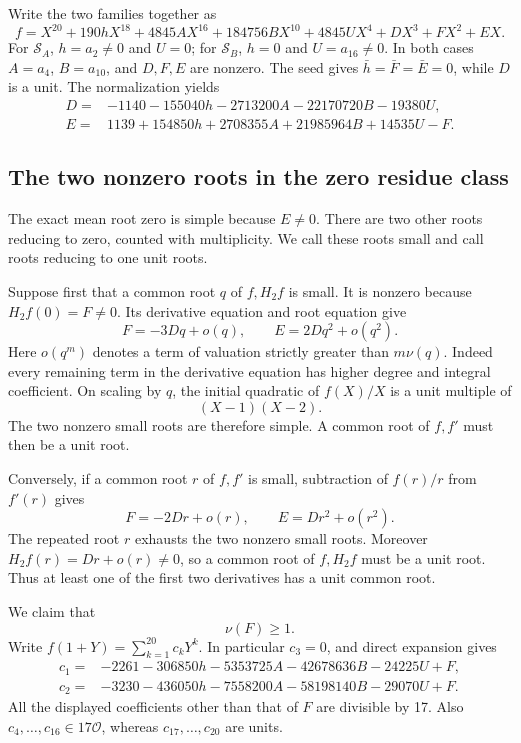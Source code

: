 \documentclass[
  british,
  10pt,
  a4paper,
]{article}
\begin{document}
Write the two families together as \[
f=X^{20}+190hX^{18}+4845AX^{16}+184756BX^{10}
   +4845UX^4+DX^3+FX^2+EX. \tag{Q1}
\] For \(\mathcal S_A\), \(h=a_2\ne0\) and \(U=0\); for
\(\mathcal S_B\), \(h=0\) and \(U=a_{16}\ne0\). In both cases \(A=a_4\),
\(B=a_{10}\), and \(D,F,E\) are nonzero. The seed gives
\(\bar h=\bar F=\bar E=0\), while \(D\) is a unit. The normalization
yields \[
\begin{aligned}
D={}&-1140-155040h-2713200A-22170720B-19380U,\\
E={}&1139+154850h+2708355A+21985964B+14535U-F.
\end{aligned} \tag{Q2}
\]

\subsection{The two nonzero roots in the zero residue
class}\label{the-two-nonzero-roots-in-the-zero-residue-class}

The exact mean root zero is simple because \(E\ne0\). There are two
other roots reducing to zero, counted with multiplicity. We call these
roots small and call roots reducing to one unit roots.

Suppose first that a common root \(q\) of \(f,H_2f\) is small. It is
nonzero because \(H_2f(0)=F\ne0\). Its derivative equation and root
equation give \[
F=-3Dq+o(q),\qquad E=2Dq^2+o(q^2). \tag{Q3}
\] Here \(o(q^m)\) denotes a term of valuation strictly greater than
\(m\nu(q)\). Indeed every remaining term in the derivative equation has
higher degree and integral coefficient. On scaling by \(q\), the initial
quadratic of \(f(X)/X\) is a unit multiple of \[
(X-1)(X-2).
\] The two nonzero small roots are therefore simple. A common root of
\(f,f'\) must then be a unit root.

Conversely, if a common root \(r\) of \(f,f'\) is small, subtraction of
\(f(r)/r\) from \(f'(r)\) gives \[
F=-2Dr+o(r),\qquad E=Dr^2+o(r^2). \tag{Q4}
\] The repeated root \(r\) exhausts the two nonzero small roots.
Moreover \(H_2f(r)=Dr+o(r)\ne0\), so a common root of \(f,H_2f\) must be
a unit root. Thus at least one of the first two derivatives has a unit
common root.

We claim that \[
\nu(F)\geq1. \tag{Q5}
\] Write \(f(1+Y)=\sum_{k=1}^{20}c_kY^k\). In particular \(c_3=0\), and
direct expansion gives \[
\begin{aligned}
c_1={}&-2261-306850h-5353725A-42678636B-24225U+F,\\
c_2={}&-3230-436050h-7558200A-58198140B-29070U+F.
\end{aligned} \tag{Q6}
\] All the displayed coefficients other than that of \(F\) are divisible
by 17. Also \(c_4,\ldots,c_{16}\in17\mathcal O\), whereas
\(c_{17},\ldots,c_{20}\) are units.
\end{document}
